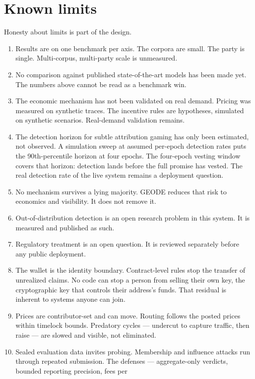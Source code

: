 \documentclass[11pt]{article}
\begin{document}
\section{Known limits}

Honesty about limits is part of the design.

\begin{enumerate}
\item Results are on one benchmark per axis. The corpora are
small. The party is single. Multi-corpus, multi-party scale is
unmeasured.
\item No comparison against published state-of-the-art models has
been made yet. The numbers above cannot be read as a benchmark
win.
\item The economic mechanism has not been validated on real
demand. Pricing was measured on synthetic traces. The incentive
rules are hypotheses, simulated on synthetic scenarios.
Real-demand validation remains.
\item The detection horizon for subtle attribution gaming has
only been estimated, not observed. A simulation sweep at assumed
per-epoch detection rates puts the 90th-percentile horizon at
four epochs. The four-epoch vesting window covers that horizon:
detection lands before the full promise has vested. The real
detection rate of the live system remains a deployment question.
\item No mechanism survives a lying majority. GEODE reduces that
risk to economics and visibility. It does not remove it.
\item Out-of-distribution detection is an open research problem
in this system. It is measured and published as such.
\item Regulatory treatment is an open question. It is reviewed
separately before any public deployment.
\item The wallet is the identity boundary. Contract-level rules
stop the transfer of unrealized claims. No code can stop a person
from selling their own key, the cryptographic key that controls
their address's funds. That residual is inherent to systems anyone
can join.
\item Prices are contributor-set and can move. Routing follows
the posted prices within timelock bounds. Predatory cycles ---
undercut to capture traffic, then raise --- are slowed and
visible, not eliminated.
\item Sealed evaluation data invites probing. Membership and
influence attacks run through repeated submission. The defenses ---
aggregate-only verdicts, bounded reporting precision, fees per

\end{enumerate}
\end{document}
